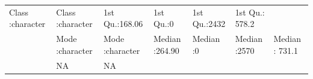 \documentclass[]{article}
\begin{document}
\begin{longtable}[]{@{}lllllll@{}}
\begin{minipage}[t]{0.15\columnwidth}
Class :character\strut
\end{minipage} & \begin{minipage}[t]{0.15\columnwidth}\raggedright\strut
Class :character\strut
\end{minipage} & \begin{minipage}[t]{0.13\columnwidth}\raggedright\strut
1st Qu.:168.06\strut
\end{minipage} & \begin{minipage}[t]{0.10\columnwidth}\raggedright\strut
1st Qu.:0\strut
\end{minipage} & \begin{minipage}[t]{0.12\columnwidth}\raggedright\strut
1st Qu.:2432\strut
\end{minipage} & \begin{minipage}[t]{0.13\columnwidth}\raggedright\strut
1st Qu.: 578.2\strut
\end{minipage}\tabularnewline
\begin{minipage}[t]{0.03\columnwidth}\raggedright\strut
\strut
\end{minipage} & \begin{minipage}[t]{0.15\columnwidth}\raggedright\strut
Mode :character\strut
\end{minipage} & \begin{minipage}[t]{0.15\columnwidth}\raggedright\strut
Mode :character\strut
\end{minipage} & \begin{minipage}[t]{0.13\columnwidth}\raggedright\strut
Median :264.90\strut
\end{minipage} & \begin{minipage}[t]{0.10\columnwidth}\raggedright\strut
Median :0\strut
\end{minipage} & \begin{minipage}[t]{0.12\columnwidth}\raggedright\strut
Median :2570\strut
\end{minipage} & \begin{minipage}[t]{0.13\columnwidth}\raggedright\strut
Median : 731.1\strut
\end{minipage}\tabularnewline
\begin{minipage}[t]{0.03\columnwidth}\raggedright\strut
\strut
\end{minipage} & \begin{minipage}[t]{0.15\columnwidth}\raggedright\strut
NA\strut
\end{minipage} & \begin{minipage}[t]{0.15\columnwidth}\raggedright\strut
NA\strut
\end{minipage} & \begin{minipage}[t]{0.13\columnwidth}\raggedright\strut

\end{minipage}
\end{longtable}
\end{document}
